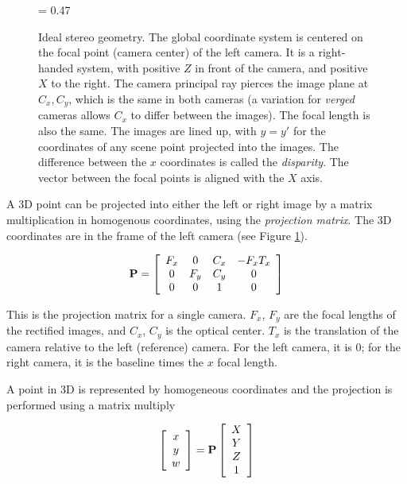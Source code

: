 \documentclass[twocolumn,oneside]{book}
\def\vec#1{\begin{array}{c}#1\end{array}}
\begin{document}
\begin{figure}

{\epsfxsize = 0.47\textwidth {}}

\caption{
Ideal stereo geometry.  The global coordinate system is centered on
the focal point (camera center) of the left camera.  It is a
right-handed system, with positive $Z$ in front of the camera, and
positive $X$ to the right.  The camera principal ray pierces the image
plane at $C_x,C_y$, which is the same in both cameras (a variation for
{\em verged} cameras allows $C_x$ to differ between the images).  The
focal length is also the same.  The images are lined up, with $y=y'$
for the coordinates of any scene point projected into the images.  The
difference between the $x$ coordinates is called the {\em disparity}.
The vector between the focal points is aligned with the $X$ axis.
\label{fig23.stereo-geometry}}

\end{figure}


A 3D point can be projected into either the left or right image by a
matrix multiplication in homogenous coordinates, using the {\em
projection matrix}.  The 3D coordinates are in the frame of the left
camera (see Figure \ref{fig23.stereo-geometry}).

\begin{eqnarray}
\bf{P} =
\left[ 
\vec{F_x \\ 0 \\ 0}
\vec{ 0\\ F_y \\ 0}
\vec{ C_x \\ C_y \\ 1}
\vec{ -F_x T_x \\ 0 \\ 0} 
\right]
\end{eqnarray}

This is the projection matrix for a single camera.  $F_x$, $F_y$ are
the focal lengths of the rectified images, and $C_x$,
$C_y$ is the optical center.  $T_x$ is the translation of
the camera relative to the left (reference) camera.  For the left
camera, it is 0; for the right camera, it is the baseline times the
$x$ focal length.

A point in 3D is represented by homogeneous coordinates and the
projection is performed using a matrix multiply

\begin{eqnarray}
\left[
\vec{x\\ y\\ w}
\right] 
=
 \bf{P} \left[ \vec{X\\ Y\\ Z \\ 1} \right]
\end{eqnarray}
 
\end{document}
